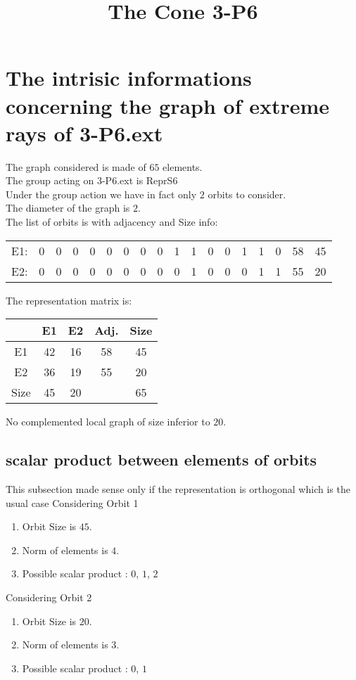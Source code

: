 \documentclass[12pt]{article}
\title{The Cone 3-P6}
\begin{document}
\maketitle
\section{The intrisic informations concerning the graph of extreme rays of 3-P6.ext}
The graph considered is made of $65$ elements.\\
The group acting on 3-P6.ext is ReprS6\\
Under the group action we have in fact only $2$ orbits to consider.\\
The diameter of the graph is $2$.\\
The list of orbits is with adjacency and Size info:
\begin{center}
\scriptsize
\begin{tabular}{cccccccccccccccc|c|c}
E1:&0&0&0&0&0&0&0&0&1&1&0&0&1&1&0&58&45\\
E2:&0&0&0&0&0&0&0&0&0&1&0&0&0&1&1&55&20\\
\end{tabular}
\end{center}
The representation matrix is:
\begin{center}
\scriptsize
\begin{tabular}{|c|cc|c|c|}
\hline
&E1&E2&Adj.&Size\\
\hline
E1& 42& 16&58&45\\
E2& 36& 19&55&20\\
\hline
Size&45&20&&65\\
\hline
\end{tabular}
\end{center}
No complemented local graph of size inferior to $20$.
\subsection{scalar product between elements of orbits}
\noindent This subsection made sense only if the representation is orthogonal which is the usual case
Considering Orbit 1
\begin{enumerate}
\item Orbit Size is $45$.
\item Norm of elements is $4$.
\item Possible scalar product : $0$, $1$, $2$
\end{enumerate}
Considering Orbit 2
\begin{enumerate}
\item Orbit Size is $20$.
\item Norm of elements is $3$.
\item Possible scalar product : $0$, $1$
\end{enumerate}
\end{document}
